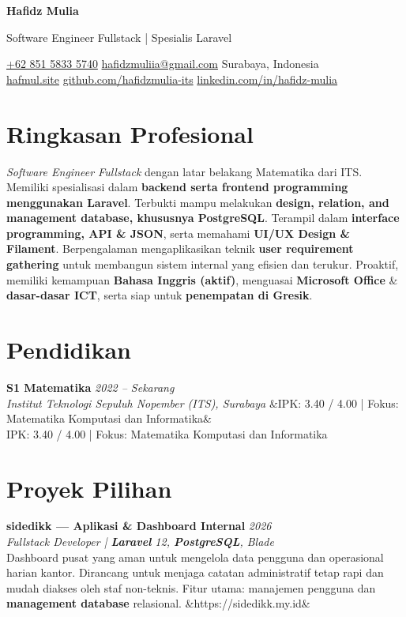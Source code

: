 \documentclass[a4paper,11pt]{article}
\newcommand{\cvname}[1]{%
  {\centering\LARGE\bfseries #1\par\vspace{2pt}}%
}
\newcommand{\cvtitle}[1]{%
  {\centering\large\color{accent} #1\par\vspace{4pt}}%
}
\newcommand{\cvcontact}[1]{%
  {\centering\small #1\par\vspace{6pt}}%
}
\newcommand{\cventry}[4]{%
  \noindent\textbf{#1} \hfill \textit{#3} \\
  \textit{#2}
  \ifx&#4& \else \\ \small #4 \fi
  \vspace{6pt}
}
\newcommand{\cvproject}[5]{%
  \noindent\textbf{#1} \hfill \textit{#2} \\
  \textit{\small #3} \\
  {\small #4}
  \ifx&#5& \else \par\noindent{\small \textcolor{accent}{\url{#5}}} \fi
  \vspace{6pt}
}
\begin{document}
\cvname{Hafidz Mulia}
\cvtitle{Software Engineer Fullstack | Spesialis Laravel}
\cvcontact{%
  \href{tel:+6285158335740}{+62 851 5833 5740} \quad\textbar\quad
  \href{mailto:hafidzmuliia@gmail.com}{hafidzmuliia@gmail.com} \quad\textbar\quad
  Surabaya, Indonesia \\
  \href{https://hafmul.site}{hafmul.site} \quad\textbar\quad
  \href{https://github.com/hafidzmulia-its}{github.com/hafidzmulia-its} \quad\textbar\quad
  \href{https://www.linkedin.com/in/hafidz-mulia/}{linkedin.com/in/hafidz-mulia}
}

\section{Ringkasan Profesional}
\textit{Software Engineer Fullstack} dengan latar belakang Matematika dari ITS. Memiliki spesialisasi dalam \textbf{backend serta frontend programming menggunakan Laravel}. Terbukti mampu melakukan \textbf{design, relation, and management database, khususnya PostgreSQL}. Terampil dalam \textbf{interface programming, API \& JSON}, serta memahami \textbf{UI/UX Design \& Filament}. Berpengalaman mengaplikasikan teknik \textbf{user requirement gathering} untuk membangun sistem internal yang efisien dan terukur. Proaktif, memiliki kemampuan \textbf{Bahasa Inggris (aktif)}, menguasai \textbf{Microsoft Office} \& \textbf{dasar-dasar ICT}, serta siap untuk \textbf{penempatan di Gresik}.

\section{Pendidikan}
\cventry
  {S1 Matematika}
  {Institut Teknologi Sepuluh Nopember (ITS), Surabaya}
  {2022 -- Sekarang}
  {IPK: 3.40 / 4.00 | Fokus: Matematika Komputasi dan Informatika}

\section{Proyek Pilihan}

\cvproject
  {sidedikk --- Aplikasi \& Dashboard Internal}
  {2026}
  {Fullstack Developer | \textbf{Laravel} 12, \textbf{PostgreSQL}, Blade}
  {Dashboard pusat yang aman untuk mengelola data pengguna dan operasional harian kantor. Dirancang untuk menjaga catatan administratif tetap rapi dan mudah diakses oleh staf non-teknis. Fitur utama: manajemen pengguna dan \textbf{management database} relasional.}
  {https://sidedikk.my.id}
\end{document}
